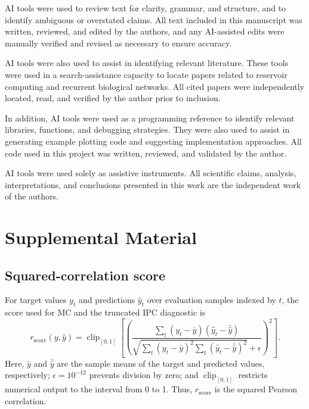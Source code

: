 \documentclass[a4paper,fleqn]{style_neural_networks/cas-dc}
\begin{document}
AI tools were used to review text for clarity, grammar, and structure, and to identify ambiguous or overstated claims. All text included in this manuscript was written, reviewed, and edited by the authors, and any AI-assisted edits were manually verified and revised as necessary to ensure accuracy.

AI tools were also used to assist in identifying relevant literature. These tools were used in a search-assistance capacity to locate papers related to reservoir computing and recurrent biological networks. All cited papers were independently located, read, and verified by the author prior to inclusion.

In addition, AI tools were used as a programming reference to identify relevant libraries, functions, and debugging strategies. They were also used to assist in generating example plotting code and suggesting implementation approaches. All code used in this project was written, reviewed, and validated by the author.

AI tools were used solely as assistive instruments. All scientific claims, analysis, interpretations, and conclusions presented in this work are the independent work of the authors.

\clearpage


\clearpage

\appendix
\section{Supplemental Material}

\subsection{Squared-correlation score}
\label{supp:r_score}
For target values \(y_t\) and predictions \(\hat{y}_t\) over evaluation samples indexed by \(t\), the score used for MC and the truncated IPC diagnostic is
\[
r_{\mathrm{score}}(y,\hat{y})
=
\operatorname{clip}_{[0,1]}\!\left[
\left(
\frac{\sum_t (y_t-\bar{y})(\hat{y}_t-\bar{\hat{y}})}
{\sqrt{\sum_t (y_t-\bar{y})^2\sum_t (\hat{y}_t-\bar{\hat{y}})^2}+\epsilon}
\right)^2
\right].
\]
Here, \(\bar{y}\) and \(\bar{\hat{y}}\) are the sample means of the target and predicted values, respectively; \(\epsilon=10^{-12}\) prevents division by zero; and \(\operatorname{clip}_{[0,1]}\) restricts numerical output to the interval from 0 to 1. Thus, \(r_{\mathrm{score}}\) is the squared Pearson correlation.
\end{document}
